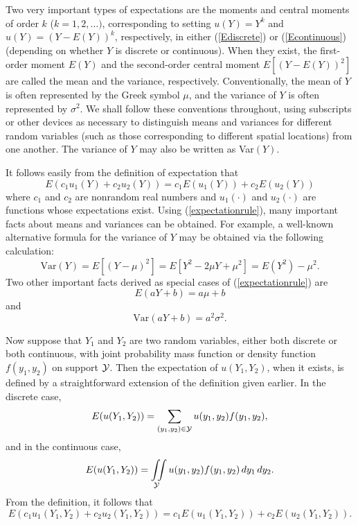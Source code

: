 Two very important types of expectations are the moments and central moments of order $k$ ($k=1,2,\ldots)$, corresponding to setting $u(Y)=Y^k$ and $u(Y)=(Y-E(Y))^k$, respectively, in either (\ref{Ediscrete}) or (\ref{Econtinuous}) (depending on whether $Y$ is discrete or continuous).  When they exist, the first-order moment $E(Y)$ and the second-order central moment $E[(Y-E(Y))^2]$ are called the mean and the variance, respectively.  Conventionally, the mean of $Y$ is often represented by the Greek symbol $\mu$, and the variance of $Y$ is often represented by $\sigma^2$.  We shall follow these conventions throughout, using subscripts or other devices as necessary to distinguish means and variances for different random variables (such as those corresponding to different spatial locations) from one another.  The variance of $Y$ may also be written as Var$(Y)$.  

It follows easily from the definition of expectation that
\begin{equation}\label{expectationrule}
E(c_1u_1(Y)+c_2u_2(Y))=c_1E(u_1(Y))+c_2E(u_2(Y))
\end{equation}
where $c_1$ and $c_2$ are nonrandom real numbers and $u_1(\cdot)$ and $u_2(\cdot)$ are functions whose expectations exist.  Using (\ref{expectationrule}), many important facts about means and variances can be obtained.  For example, a well-known alternative formula for the variance of $Y$ may be obtained via the following calculation:
\begin{equation}\label{altvariance}
\mbox{Var}(Y)=E[(Y-\mu)^2]=E[Y^2-2\mu Y+\mu^2]=E(Y^2)-\mu^2.
\end{equation}
Two other important facts derived as special cases of (\ref{expectationrule}) are
\begin{equation}\label{Elinearform}
E(aY+b)=a\mu+b
\end{equation}
and
\begin{equation}\label{Varlinearform}
\mbox{Var}(aY+b)=a^2\sigma^2.
\end{equation}

Now suppose that $Y_1$ and $Y_2$ are two random variables, either both discrete or both continuous, with joint probability mass function or density function $f(y_1,y_2)$ on support ${\cal Y}$.  Then the expectation of $u(Y_1,Y_2)$, when it exists, is defined by a straightforward extension of the definition given earlier.  In the discrete case,
\[ E(u(Y_1,Y_2))=\sum_{(y_1,y_2)\in{\cal Y}}u(y_1,y_2)f(y_1,y_2), \]
and in the continuous case,
\[ E(u(Y_1,Y_2))=\iint\limits_{\cal Y}u(y_1,y_2)f(y_1,y_2)\,dy_1\,dy_2. \]
From the definition, it follows that
\begin{equation}\label{expectationrulebivariate}
E(c_1u_1(Y_1,Y_2)+c_2u_2(Y_1,Y_2))=c_1E(u_1(Y_1,Y_2))+c_2E(u_2(Y_1,Y_2)).
\end{equation}

